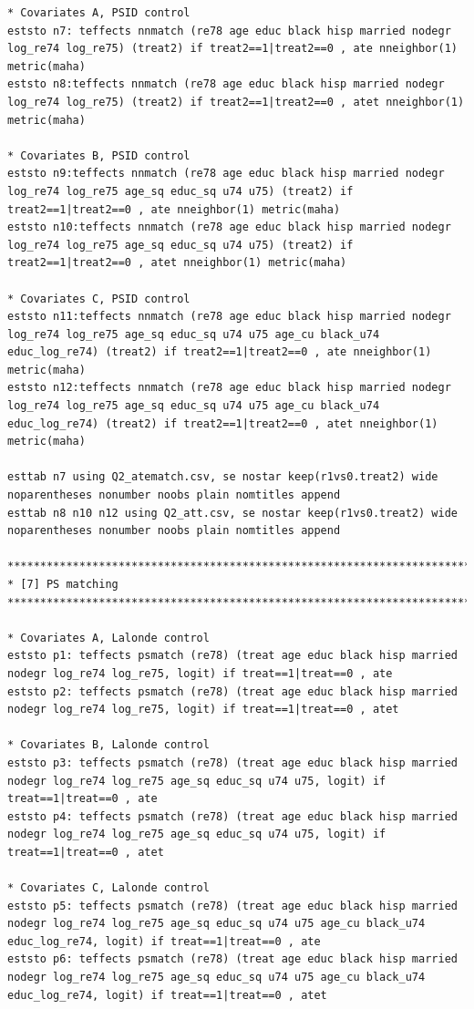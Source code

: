 \documentclass[12pt]{article}
\begin{document}
\begin{verbatim}
* Covariates A, PSID control
eststo n7: teffects nnmatch (re78 age educ black hisp married nodegr log_re74 log_re75) (treat2) if treat2==1|treat2==0 , ate nneighbor(1) metric(maha)
eststo n8:teffects nnmatch (re78 age educ black hisp married nodegr log_re74 log_re75) (treat2) if treat2==1|treat2==0 , atet nneighbor(1) metric(maha)

* Covariates B, PSID control
eststo n9:teffects nnmatch (re78 age educ black hisp married nodegr log_re74 log_re75 age_sq educ_sq u74 u75) (treat2) if treat2==1|treat2==0 , ate nneighbor(1) metric(maha)
eststo n10:teffects nnmatch (re78 age educ black hisp married nodegr log_re74 log_re75 age_sq educ_sq u74 u75) (treat2) if treat2==1|treat2==0 , atet nneighbor(1) metric(maha)

* Covariates C, PSID control
eststo n11:teffects nnmatch (re78 age educ black hisp married nodegr log_re74 log_re75 age_sq educ_sq u74 u75 age_cu black_u74 educ_log_re74) (treat2) if treat2==1|treat2==0 , ate nneighbor(1) metric(maha)
eststo n12:teffects nnmatch (re78 age educ black hisp married nodegr log_re74 log_re75 age_sq educ_sq u74 u75 age_cu black_u74 educ_log_re74) (treat2) if treat2==1|treat2==0 , atet nneighbor(1) metric(maha)

esttab n7 using Q2_atematch.csv, se nostar keep(r1vs0.treat2) wide noparentheses nonumber noobs plain nomtitles append
esttab n8 n10 n12 using Q2_att.csv, se nostar keep(r1vs0.treat2) wide noparentheses nonumber noobs plain nomtitles append

********************************************************************************
* [7] PS matching
********************************************************************************

* Covariates A, Lalonde control
eststo p1: teffects psmatch (re78) (treat age educ black hisp married nodegr log_re74 log_re75, logit) if treat==1|treat==0 , ate 
eststo p2: teffects psmatch (re78) (treat age educ black hisp married nodegr log_re74 log_re75, logit) if treat==1|treat==0 , atet 

* Covariates B, Lalonde control
eststo p3: teffects psmatch (re78) (treat age educ black hisp married nodegr log_re74 log_re75 age_sq educ_sq u74 u75, logit) if treat==1|treat==0 , ate 
eststo p4: teffects psmatch (re78) (treat age educ black hisp married nodegr log_re74 log_re75 age_sq educ_sq u74 u75, logit) if treat==1|treat==0 , atet

* Covariates C, Lalonde control
eststo p5: teffects psmatch (re78) (treat age educ black hisp married nodegr log_re74 log_re75 age_sq educ_sq u74 u75 age_cu black_u74 educ_log_re74, logit) if treat==1|treat==0 , ate 
eststo p6: teffects psmatch (re78) (treat age educ black hisp married nodegr log_re74 log_re75 age_sq educ_sq u74 u75 age_cu black_u74 educ_log_re74, logit) if treat==1|treat==0 , atet 


\end{verbatim}
\end{document}
